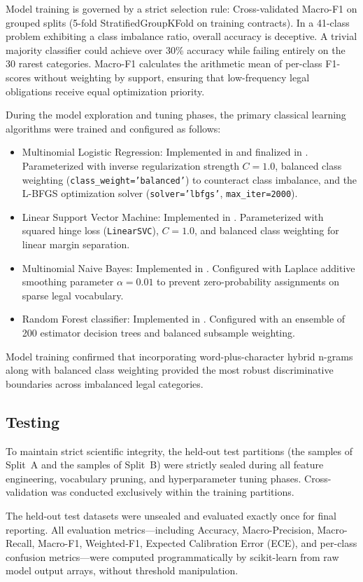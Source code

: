 Model training is governed by a strict selection rule: Cross-validated Macro-F1 on grouped splits (5-fold StratifiedGroupKFold on training contracts). In a 41-class problem exhibiting a \ImbalanceRatio{} class imbalance ratio, overall accuracy is deceptive. A trivial majority classifier could achieve over 30\% accuracy while failing entirely on the 30 rarest categories. Macro-F1 calculates the arithmetic mean of per-class F1-scores without weighting by support, ensuring that low-frequency legal obligations receive equal optimization priority.

During the model exploration and tuning phases, the primary classical learning algorithms were trained and configured as follows:
\begin{itemize}
    \item Multinomial Logistic Regression: Implemented in  and finalized in . Parameterized with inverse regularization strength $C = 1.0$, balanced class weighting (\texttt{class\_weight='balanced'}) to counteract class imbalance, and the L-BFGS optimization solver (\texttt{solver='lbfgs'}, \texttt{max\_iter=2000}).
    \item Linear Support Vector Machine: Implemented in . Parameterized with squared hinge loss (\texttt{LinearSVC}), $C = 1.0$, and balanced class weighting for linear margin separation.
    \item Multinomial Naive Bayes: Implemented in . Configured with Laplace additive smoothing parameter $\alpha = 0.01$ to prevent zero-probability assignments on sparse legal vocabulary.
    \item Random Forest classifier: Implemented in . Configured with an ensemble of 200 estimator decision trees and balanced subsample weighting.
\end{itemize}

Model training confirmed that incorporating word-plus-character hybrid n-grams along with balanced class weighting provided the most robust discriminative boundaries across imbalanced legal categories.

\subsection{Testing}
\label{subsec:testing}

To maintain strict scientific integrity, the held-out test partitions (the \SplitATestClauses{} samples of Split~A and the \SplitBTestClauses{} samples of Split~B) were strictly sealed during all feature engineering, vocabulary pruning, and hyperparameter tuning phases. Cross-validation was conducted exclusively within the training partitions.

The held-out test datasets were unsealed and evaluated exactly once for final reporting. All evaluation metrics---including Accuracy, Macro-Precision, Macro-Recall, Macro-F1, Weighted-F1, Expected Calibration Error (ECE), and per-class confusion metrics---were computed programmatically by scikit-learn from raw model output arrays, without threshold manipulation.
